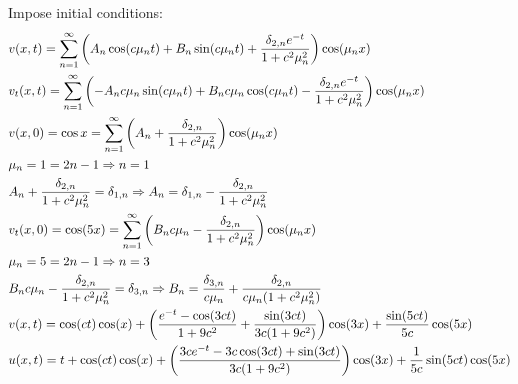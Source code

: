 \documentclass[11pt, fleqn]{article}
\begin{document}
Impose initial conditions:
\begin{align*}
    &v(x,t)=\sum_{n=1}^\infty\left( A_n\cos(c\mu_nt)+B_n\sin(c\mu_nt)+\frac{\delta_{2,n}e^{-t}}{1+c^2\mu_n^2} \right)\cos(\mu_nx)\\
    &v_t(x,t)=\sum_{n=1}^\infty\left( -A_nc\mu_n\sin(c\mu_nt)+B_nc\mu_n\cos(c\mu_nt)-\frac{\delta_{2,n}e^{-t}}{1+c^2\mu_n^2} \right)\cos(\mu_nx)\\
    &v(x,0)=\cos x=\sum_{n=1}^\infty\left( A_n+\frac{\delta_{2,n}}{1+c^2\mu_n^2} \right)\cos(\mu_nx)\\
    &\mu_n=1=2n-1\Rightarrow n=1\\
    &A_n+\frac{\delta_{2,n}}{1+c^2\mu_n^2}=\delta_{1,n}\Rightarrow A_n=\delta_{1,n}-\frac{\delta_{2,n}}{1+c^2\mu_n^2}\\
    &v_t(x,0)=\cos(5x)=\sum_{n=1}^\infty \left( B_nc\mu_n-\frac{\delta_{2,n}}{1+c^2\mu_n^2} \right)\cos(\mu_nx)\\
    &\mu_n=5=2n-1\Rightarrow n=3\\
    &B_nc\mu_n-\frac{\delta_{2,n}}{1+c^2\mu_n^2}=\delta_{3,n}\Rightarrow B_n=\frac{\delta_{3,n}}{c\mu_n}+\frac{\delta_{2,n}}{c\mu_n(1+c^2\mu_n^2)}\\
    &v(x,t)=\cos(ct)\cos(x)+\left( \frac{e^{-t}-\cos(3ct)}{1+9c^2}+\frac{\sin(3ct)}{3c(1+9c^2)} \right)\cos(3x)+\frac{\sin(5ct)}{5c}\cos(5x)\\
    &u(x,t)=t+\cos(ct)\cos(x)+\left( \frac{3ce^{-t}-3c\cos(3ct)+\sin(3ct)}{3c(1+9c^2)} \right)\cos(3x)+\frac{1}{5c}\sin(5ct)\cos(5x)
\end{align*}
\end{document}
